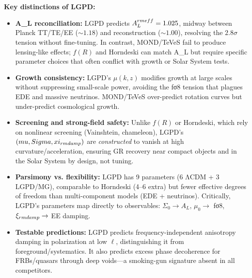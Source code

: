 \begin{table*}[t]
\textbf{Key distinctions of LGPD:}
\begin{itemize}
  \item \textbf{A\_L reconciliation:} LGPD predicts $A_L^{\\rm eff} = 1.025$, midway between Planck TT/TE/EE ($\sim 1.18$) and reconstruction ($\sim 1.00$), resolving the $2.8\sigma$ tension without fine-tuning. In contrast, MOND/TeVeS fail to produce lensing-like effects; $f(R)$ and Horndeski can match A\_L but require specific parameter choices that often conflict with growth or Solar System tests.
  
  \item \textbf{Growth consistency:} LGPD's $\mu(k,z)$ modifies growth at large scales without suppressing small-scale power, avoiding the fσ8 tension that plagues EDE and massive neutrinos. MOND/TeVeS over-predict rotation curves but under-predict cosmological growth.
  
  \item \textbf{Screening and strong-field safety:} Unlike $f(R)$ or Horndeski, which rely on nonlinear screening (Vainshtein, chameleon), LGPD's $(\\mu,\\Sigma,\\xi_{\\rm damp})$ are \emph{constructed} to vanish at high curvature/acceleration, ensuring GR recovery near compact objects and in the Solar System by design, not tuning.
  
  \item \textbf{Parsimony vs. flexibility:} LGPD has 9 parameters (6 ΛCDM + 3 LGPD/MG), comparable to Horndeski (4--6 extra) but fewer effective degrees of freedom than multi-component models (EDE + neutrinos). Critically, LGPD's parameters map directly to observables: $\Sigma_0 \to A_L$, $\mu_0 \to$ fσ8, $\xi_{\\rm damp} \to$ EE damping.
  
  \item \textbf{Testable predictions:} LGPD predicts frequency-independent anisotropy damping in polarization at low $\ell$, distinguishing it from foreground/systematics. It also predicts excess phase decoherence for FRBs/quasars through deep voids—a smoking-gun signature absent in all competitors.
\end{itemize}


\end{table*}

